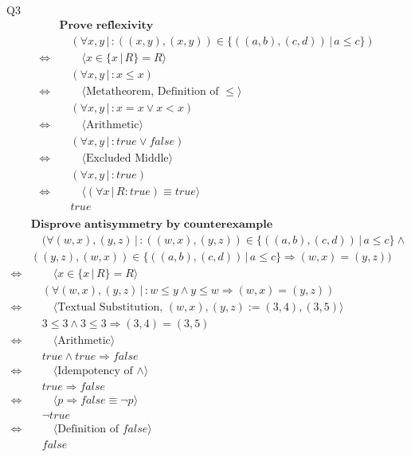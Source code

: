 \documentclass{article}
\begin{document}
    \vspace{10mm}
    Q3
    \begin{align*}
    & \textbf{Prove reflexivity} \\
    & \quad (\forall x,y\,|\,: ((x,y),(x,y))\in \{((a,b),(c,d))\,|\, a\leq c\}) \\
    \Longleftrightarrow & \qquad \langle x\in\{x\,|\,R\}=R \rangle \\
    & \quad (\forall x,y\,|\,: x\leq x) \\
    \Longleftrightarrow & \qquad \langle \text{Metatheorem, Definition of } \leq \rangle \\
    & \quad (\forall x,y\,|\,: x=x \vee x<x) \\
    \Longleftrightarrow & \qquad \langle \text{Arithmetic} \rangle \\
    & \quad (\forall x,y\,|\,: true \vee false) \\
    \Longleftrightarrow & \qquad \langle \text{Excluded Middle} \rangle \\
    & \quad (\forall x,y\,|\,: true) \\
    \Longleftrightarrow & \qquad \langle (\forall x\,|\, R: true) \equiv true \rangle \\
    & \quad true \\
    \end{align*}
    \begin{align*}
    & \textbf{Disprove antisymmetry by counterexample} \\
    & \quad (\forall (w,x),(y,z)\,|\,: ((w,x),(y,z))\in \{((a,b),(c,d))\,|\, a\leq c\} \land \\
    & ((y,z),(w,x))\in \{((a,b),(c,d))\,|\, a\leq c\} \Longrightarrow (w,x)=(y,z)) \\
    \Longleftrightarrow & \qquad \langle x\in\{x\,|\,R\}=R \rangle \\
    & \quad (\forall (w,x),(y,z)\,|\,: w\leq y \land y\leq w \Longrightarrow (w,x)=(y,z)) \\
    \Longleftrightarrow & \qquad \langle \text{Textual Substitution, } (w,x),(y,z):=(3,4),(3,5) \rangle \\
    & \quad 3\leq 3 \land 3\leq 3 \Longrightarrow (3,4)=(3,5) \\
    \Longleftrightarrow & \qquad \langle \text{Arithmetic} \rangle \\
    & \quad true \land true \Longrightarrow false \\
    \Longleftrightarrow & \qquad \langle \text{Idempotency of } \land \rangle \\
    & \quad true \Longrightarrow false \\
    \Longleftrightarrow & \qquad \langle p \Longrightarrow false \equiv \neg p \rangle \\
    & \quad \neg true \\
    \Longleftrightarrow & \qquad \langle \text{Definition of } false \rangle \\
    & \quad false \\
    \end{align*}
\end{document}
